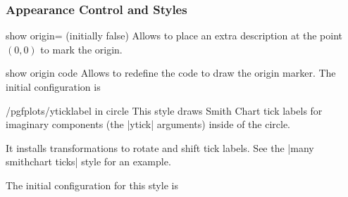\subsubsection{Appearance Control and Styles}
\begin{pgfplotskey}{show origin= (initially false)}
	Allows to place an extra description at the point $(0,0)$ to mark the origin.
\begin{codeexample}[]
\end{codeexample}
\begin{pgfplotscodekey}{show origin code}
	Allows to redefine the code to draw the origin marker. The initial configuration is
\begin{codeexample}
\end{codeexample}
\end{pgfplotscodekey}
\end{pgfplotskey}

\begin{stylekey}{/pgfplots/yticklabel in circle}
	This style draws Smith Chart tick labels for imaginary components (the |ytick| arguments) inside of the circle.

	It installs transformations to rotate and shift tick labels. See the |many smithchart ticks| style for an example.

	The initial configuration for this style is
\begin{codeexample}
\end{codeexample}
\end{stylekey}

